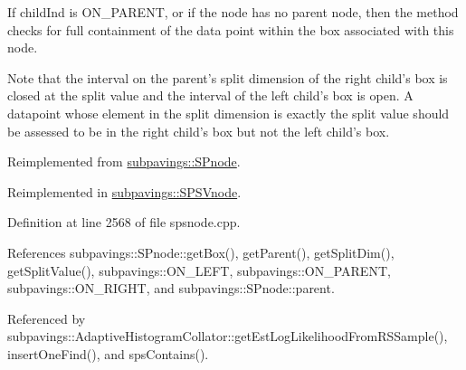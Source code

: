 \-If child\-Ind is \-O\-N\-\_\-\-P\-A\-R\-E\-N\-T, or if the node has no parent node, then the method checks for full containment of the data point within the box associated with this node.

\-Note that the interval on the parent's split dimension of the right child's box is closed at the split value and the interval of the left child's box is open. \-A datapoint whose element in the split dimension is exactly the split value should be assessed to be in the right child's box but not the left child's box. 

\-Reimplemented from \hyperlink{classsubpavings_1_1SPnode_aaefe6100d8c62dc84849cd2adb733ffb}{subpavings\-::\-S\-Pnode}.



\-Reimplemented in \hyperlink{classsubpavings_1_1SPSVnode_a803d11f31d86f0565dbe682a33099698}{subpavings\-::\-S\-P\-S\-Vnode}.



\-Definition at line 2568 of file spsnode.\-cpp.



\-References subpavings\-::\-S\-Pnode\-::get\-Box(), get\-Parent(), get\-Split\-Dim(), get\-Split\-Value(), subpavings\-::\-O\-N\-\_\-\-L\-E\-F\-T, subpavings\-::\-O\-N\-\_\-\-P\-A\-R\-E\-N\-T, subpavings\-::\-O\-N\-\_\-\-R\-I\-G\-H\-T, and subpavings\-::\-S\-Pnode\-::parent.



\-Referenced by subpavings\-::\-Adaptive\-Histogram\-Collator\-::get\-Est\-Log\-Likelihood\-From\-R\-S\-Sample(), insert\-One\-Find(), and sps\-Contains().



